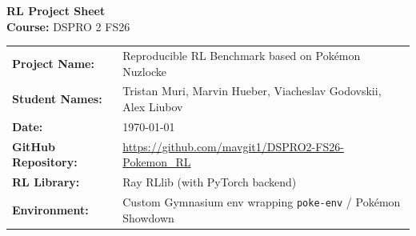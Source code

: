 \documentclass[11pt, a4paper]{article}
\begin{document}
\begin{center}
    {\huge \bfseries \color{primaryBlue} RL Project Sheet} \\[0.2cm]
    {\large \textbf{Course:} DSPRO 2 FS26} \\[0.1cm]
\end{center}

\vspace{0.4cm}

\begin{studentbox}
    \begin{tabularx}{\textwidth}{l X}
        \textbf{Project Name:} & Reproducible RL Benchmark based on Pok\'{e}mon Nuzlocke \\
        \textbf{Student Names:} & Tristan Muri, Marvin Hueber, Viacheslav Godovskii, Alex Liubov \\
        \textbf{Date:} & \today \\
        \textbf{GitHub Repository:} & \url{https://github.com/mavgit1/DSPRO2-FS26-Pokemon_RL} \\
        \textbf{RL Library:} & Ray RLlib (with PyTorch backend) \\
        \textbf{Environment:} & Custom Gymnasium env wrapping \texttt{poke-env} / Pok\'{e}mon Showdown \\
    \end{tabularx}
\end{studentbox}

\vspace{0.5cm}

\end{document}
